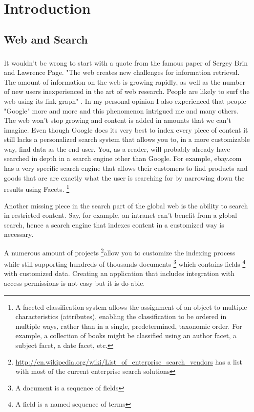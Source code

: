 \chapter{Introduction}

\section{Web and Search}

\paragraph{}
It wouldn't be wrong to start with a quote from the famous paper of Sergey Brin and Lawrence Page. "The web creates new challenges for information retrieval. The amount of information on the web is growing rapidly, as well as the number of new users inexperienced in the art of web research. People are likely to surf the web using its link graph" \cite{Brin98}.
In my personal opinion I also experienced that people "Google" more and more and this phenomenon intrigued me and many others. The web won't stop growing and content is added in amounts that we can't imagine. Even though Google does its very best to index every piece of content it still lacks a personalized search system that allows you to, in a more customizable way, find data as the end-user. You, as a reader, will probably already have searched in depth in a search engine other than Google. For example, ebay.com has a very specific search engine that allows their customers to find products and goods that are are exactly what the user is searching for by narrowing down the results using Facets. \footnote{A faceted classification system allows the assignment of an object to multiple characteristics (attributes), enabling the classification to be ordered in multiple ways, rather than in a single, predetermined, taxonomic order. For example, a collection of books might be classified using an author facet, a subject facet, a date facet, etc.}

Another missing piece in the search part of the global web is the ability to search in restricted content. Say, for example, an intranet can't benefit from a global search, hence a search engine that indexes content in a customized way is necessary. 

A numerous amount of projects \footnote{\url{http://en.wikipedia.org/wiki/List_of_enterprise_search_vendors} has a list with
 most of the current enterprise search solutions}allow you to customize the indexing process while still supporting hundreds of thousands documents \footnote{A document is a sequence of fields} which contains fields \footnote{A field is a named sequence of terms} with customized data. Creating an application that includes integration with access permissions is not easy but it is do-able.


